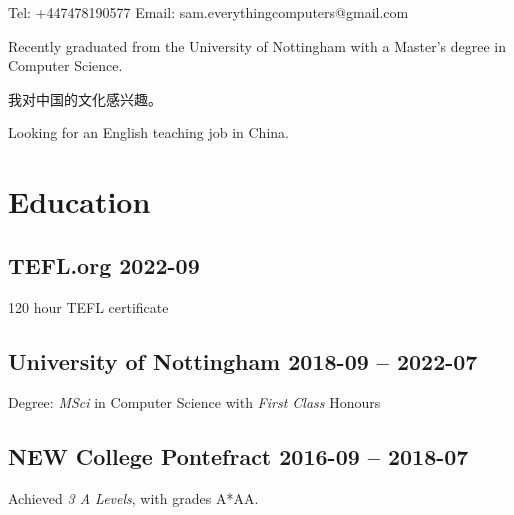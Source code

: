 


\title{}
\author{Sam Robert Whitehead}

\maketitle

\pagestyle{empty}
\thispagestyle{empty}

Tel:
+447478190577
\hfill
Email:
sam.everythingcomputers@gmail.com

\vspace{2mm}
Recently graduated from the University of Nottingham with a Master's degree in
Computer Science.

我对中国的文化感兴趣。

Looking for an English teaching job in China.
\section{Education}
    \subsection{TEFL.org \hfill 2022-09}
        120 hour TEFL certificate
    \subsection{University of Nottingham
        \hfill 2018-09 -- 2022-07}
        Degree: \emph{MSci} in Computer Science with \emph{First Class} Honours
    \subsection{NEW College Pontefract
        \hfill 2016-09 -- 2018-07}
        Achieved \emph{3 A Levels}, with grades
        A*AA\footnotemark[2].
